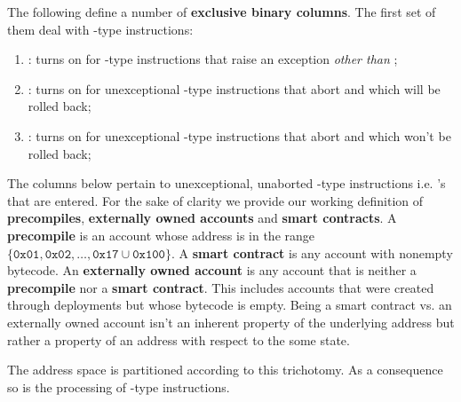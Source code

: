 The following define a number of \textbf{exclusive binary columns}.
The first set of them deal with -type instructions:
\begin{enumerate}
	\item \scenCallException:
		turns on for -type instructions that raise an exception \emph{other than} \suxSH{};
	\item \scenCallAbortWillRevert:
		turns on for unexceptional -type instructions that abort and which will be rolled back;
	\item \scenCallAbortWontRevert:
		turns on for unexceptional -type instructions that abort and which won't be rolled back;
\end{enumerate}
The columns below pertain to unexceptional, unaborted -type instructions i.e. 's that are entered. 
For the sake of clarity we provide our working definition of \textbf{precompiles}, \textbf{externally owned accounts} and \textbf{smart contracts}.
A \textbf{precompile} is an account whose address is in the range $\{\texttt{0x01},\texttt{0x02},\dots, \texttt{0x17} \cup \texttt{0x100}\}$.
A \textbf{smart contract} is any account with nonempty bytecode.
An \textbf{externally owned account} is any account that is neither a \textbf{precompile} nor a \textbf{smart contract}. 
This includes accounts that were created through deployments but whose bytecode is empty.
Being a smart contract vs. an externally owned account isn't an inherent property of the underlying address but rather a property of an address with respect to the some state. 

\saNote{} The address space is partitioned according to this trichotomy. As a consequence so is the processing of -type instructions.

